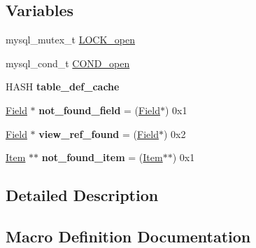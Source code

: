 \subsection*{Variables}
\begin{DoxyCompactItemize}
\item 
mysql\+\_\+mutex\+\_\+t \mbox{\hyperlink{group__Data__Dictionary_ga99c8e1e3e72cd74032d5f11c486911fd}{L\+O\+C\+K\+\_\+open}}
\item 
mysql\+\_\+cond\+\_\+t \mbox{\hyperlink{group__Data__Dictionary_ga7a682517d27176617b45212332a96a9d}{C\+O\+N\+D\+\_\+open}}
\item 
\mbox{\label{group__Data__Dictionary_gaf3f89faf859f3162a4d7476410c4a69e}} 
H\+A\+SH {\bfseries table\+\_\+def\+\_\+cache}
\item 
\mbox{\label{group__Data__Dictionary_ga9133e87930df59fe74ca492acf5295f7}} 
\mbox{\hyperlink{classField}{Field}} $\ast$ {\bfseries not\+\_\+found\+\_\+field} = (\mbox{\hyperlink{classField}{Field}}$\ast$) 0x1
\item 
\mbox{\label{group__Data__Dictionary_gaba50986729b2cfd3be1c762e666d3d18}} 
\mbox{\hyperlink{classField}{Field}} $\ast$ {\bfseries view\+\_\+ref\+\_\+found} = (\mbox{\hyperlink{classField}{Field}}$\ast$) 0x2
\item 
\mbox{\label{group__Data__Dictionary_gac130a94f4d55acec35aa42626af9f37f}} 
\mbox{\hyperlink{classItem}{Item}} $\ast$$\ast$ {\bfseries not\+\_\+found\+\_\+item} = (\mbox{\hyperlink{classItem}{Item}}$\ast$$\ast$) 0x1
\end{DoxyCompactItemize}


\subsection{Detailed Description}


\subsection{Macro Definition Documentation}
\mbox{\label{group__Data__Dictionary_ga176a646a5a04af4bf68c0f149af5dd00}} 
